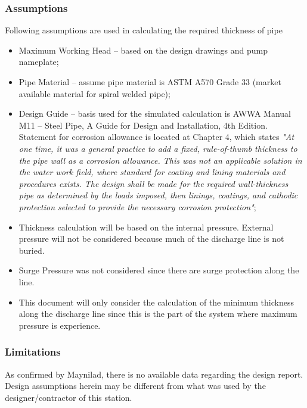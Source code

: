 



\subsubsection{Assumptions}
Following assumptions are used in calculating the required thickness of pipe
\begin{itemize}
\item Maximum Working Head – based on the design drawings and pump nameplate;
\item Pipe Material – assume pipe material is ASTM A570 Grade 33 (market available material for spiral welded pipe);
\item Design Guide – basis used for the simulated calculation is AWWA  Manual M11 – Steel Pipe, A Guide for Design and Installation, 4th Edition. Statement for corrosion allowance is located at Chapter 4, which states \textit{"At one time, it was a general practice to add a fixed, rule-of-thumb thickness to the pipe wall as a corrosion allowance. This was not an applicable solution in the water work field, where standard for coating and lining materials and procedures exists. The design shall be made for the required wall-thickness pipe as determined by the loads imposed, then linings, coatings, and cathodic protection selected to provide the necessary corrosion protection"};
\item Thickness calculation will be based on the internal pressure. External pressure will not be considered because much of the discharge line is not buried.
\item 	Surge Pressure was not considered since there are surge protection along the line. 
\item 	This document will only consider the calculation of the minimum thickness along the discharge line since this is the part of the system where maximum pressure is experience.
\end{itemize}
\subsubsection{Limitations}
As confirmed by Maynilad, there is no available data regarding the design report. Design assumptions herein may be different from what was used by the designer/contractor of this station.

